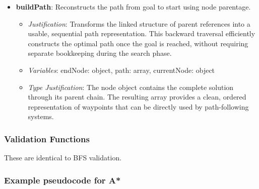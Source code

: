 \begin{itemize}
\item \textbf{buildPath}: Reconstructs the path from goal to start using node parentage. \begin{itemize} \item \textit{Justification}: Transforms the linked structure of parent references into a usable, sequential path representation. This backward traversal efficiently constructs the optimal path once the goal is reached, without requiring separate bookkeeping during the search phase. \item \textit{Variables}: endNode: object, path: array, currentNode: object \item \textit{Type Justification}: The node object contains the complete solution through its parent chain. The resulting array provides a clean, ordered representation of waypoints that can be directly used by path-following systems. \end{itemize} \end{itemize}

\subsubsection*{Validation Functions}

These are identical to BFS validation.

\newpage

\subsubsection{Example pseudocode for A*}

